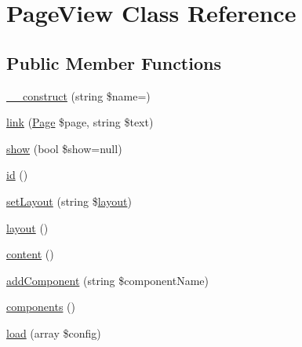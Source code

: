 \hypertarget{class_lora_1_1_page_view}{}\section{Page\+View Class Reference}
\label{class_lora_1_1_page_view}
\subsection*{Public Member Functions}
\begin{DoxyCompactItemize}
\item 
\hyperlink{class_lora_1_1_page_view_af90bbf86e6056724a44e281fb7125565}{\+\_\+\+\_\+construct} (string \$name=\textquotesingle{}\textquotesingle{})
\item 
\hyperlink{class_lora_1_1_page_view_a476c28dc9ec4f9be50d2e19ad74f4a06}{link} (\hyperlink{class_lora_1_1_page}{Page} \$page, string \$text)
\item 
\hyperlink{class_lora_1_1_page_view_a14fdcc82bbf2c7647e9c6821a2227a1f}{show} (bool \$show=null)
\item 
\hyperlink{class_lora_1_1_page_view_a087060b582403885d08e89ad894ecc5d}{id} ()
\item 
\hyperlink{class_lora_1_1_page_view_a3178ecfe82b87d56467cd68c74300201}{set\+Layout} (string \$\hyperlink{class_lora_1_1_page_view_a0e9447221830f8629717836bd933a164}{layout})
\item 
\hyperlink{class_lora_1_1_page_view_a0e9447221830f8629717836bd933a164}{layout} ()
\item 
\hyperlink{class_lora_1_1_page_view_a9b80bb36f89498eac4f43bf08461240d}{content} ()
\item 
\hyperlink{class_lora_1_1_page_view_aa3b783aa411b948184d94c54f1b5e2b3}{add\+Component} (string \$component\+Name)
\item 
\hyperlink{class_lora_1_1_page_view_abed72eecd6815f748031505225cc1319}{components} ()
\item 
\hyperlink{class_lora_1_1_page_view_a2cb0c3fbaa3e77419479aef9716f1ce3}{load} (array \$config)
\end{DoxyCompactItemize}

